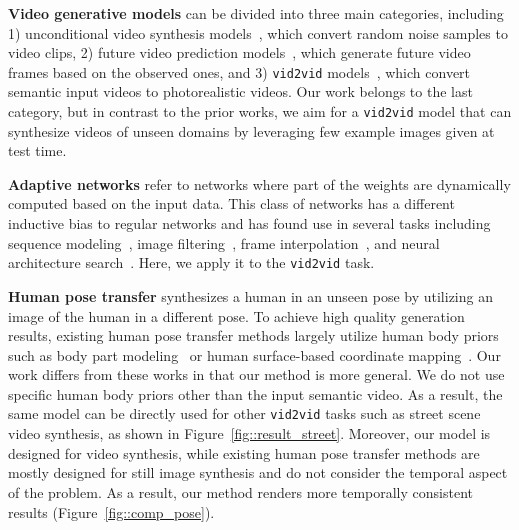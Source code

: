\documentclass{article}
\newcommand{\vidtovid}{{\texttt{vid2vid}}\xspace}
\begin{document}
{\bf Video generative models} can be divided into three main categories, including 1) unconditional video synthesis models~\cite{vondrick2016generating,saito2017temporal,tulyakov2017mocogan}, which convert random noise samples to video clips, 2) future video prediction models~\cite{srivastava2015unsupervised,kalchbrenner2016video, finn2016unsupervised,mathieu2015deep,lotter2016deep,xue2016visual,walker2016uncertain,walker2017pose,denton2017unsupervised,villegas2017decomposing,liang2017dual,lee2018stochastic,hu2018video,li2018flow,hao2018controllable,pan2019video}, which generate future video frames based on the observed ones, and 3) \vidtovid models~\cite{wang2018video,chan2018everybody,gafni2019vid2game,zhou2019dance}, which convert semantic input videos to photorealistic videos. Our work belongs to the last category, but in contrast to the prior works, we aim for a \vidtovid model that can synthesize videos of unseen domains by leveraging few example images given at test time.

{\bf Adaptive networks} refer to networks where part of the weights are dynamically computed based on the input data. This class of networks has a different inductive bias to regular networks and has found use in several tasks including sequence modeling~\cite{ha2016hypernetworks}, image filtering~\cite{jia2016dynamic,wu2018dynamic,su2019pixel}, frame interpolation~\cite{niklaus2017video,niklaus2017video2}, and neural architecture search~\cite{zhang2019graph}. Here, we apply it to the \vidtovid task. 

{\bf Human pose transfer} synthesizes a human in an unseen pose by utilizing an image of the human in a different pose. To achieve high quality generation results, existing human pose transfer methods largely utilize human body priors such as body part modeling~\cite{balakrishnan2018synthesizing} or human surface-based coordinate mapping~\cite{neverova2018dense}. Our work differs from these works in that our method is more general. We do not use specific human body priors other than the input semantic video. As a result, the same model can be directly used for other \vidtovid tasks such as street scene video synthesis, as shown in Figure~\ref{fig::result_street}. Moreover, our model is designed for video synthesis, while existing human pose transfer methods are mostly designed for still image synthesis and do not consider the temporal aspect of the problem. As a result, our method renders more temporally consistent results (Figure~\ref{fig::comp_pose}). \vspace{-2mm}
\end{document}
